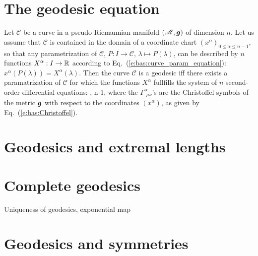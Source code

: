 \section{The geodesic equation}

\begin{greybox}
Let $\mathcal{C}$ be a curve in a pseudo-Riemannian
manifold $(\mathscr{M},\bm{g})$ of dimension $n$. Let us assume that
$\mathcal{C}$ is contained in the domain of a coordinate chart $(x^\alpha)_{0\leq\alpha\leq n-1}$,
so that any parametrization of $\mathcal{C}$, $P: I \to  \mathcal{C}$, $\lambda\mapsto P(\lambda)$,
can be described by $n$ functions $X^\alpha: I\to \mathbb{R}$
according to Eq.~(\ref{e:bas:curve_param_equation}): $x^\alpha(P(\lambda)) = X^\alpha(\lambda)$.
Then the curve $\mathcal{C}$ is a geodesic iff there exists a paramatrization of $\mathcal{C}$
for which the functions $X^\alpha$ fullfills the system of $n$ second-order differential equations:
\be
    ,   \leq \alpha \leq n-1,
\ee
where the $\Gamma^\alpha_{\ \, \mu \nu}$'s are the Christoffel symbols of the metric $\bm{g}$
with respect to the coordinates $(x^\alpha)$, as given by Eq.~(\ref{e:bas:Christoffel}).
\end{greybox}


\section{Geodesics and extremal lengths}

\section{Complete geodesics}

Uniqueness of geodesics, exponential map

\section{Geodesics and symmetries}


